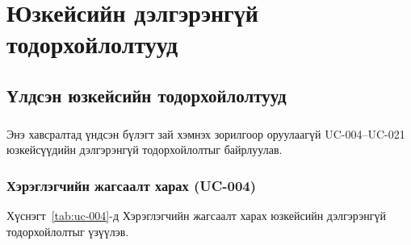 
\chapter{Юзкейсийн дэлгэрэнгүй тодорхойлолтууд}
\label{AppendixUsecaseSpecs}

\section{Үлдсэн юзкейсийн тодорхойлолтууд}
\label{sec:appendix-usecase-specs}

\paragraph{}
Энэ хавсралтад үндсэн бүлэгт зай хэмнэх зорилгоор оруулаагүй UC-004--UC-021 юзкейсүүдийн дэлгэрэнгүй тодорхойлолтыг байрлуулав.

\providecommand{\usecasecreatedby}{\shortname}
\providecommand{\usecasecreateddateearly}{2026-02-27}
\providecommand{\usecasecreateddatelate}{2026-03-12}

\subsection{Хэрэглэгчийн жагсаалт харах (UC-004)}

Хүснэгт~\ref{tab:uc-004}-д Хэрэглэгчийн жагсаалт харах юзкейсийн дэлгэрэнгүй тодорхойлолтыг үзүүлэв.

